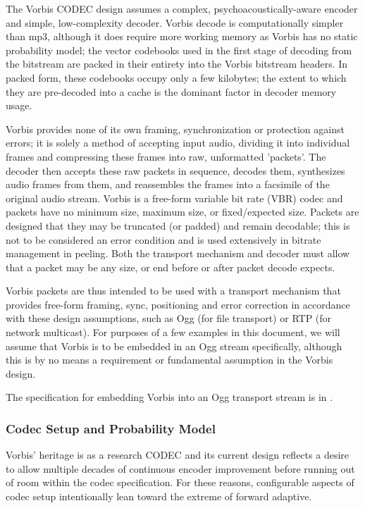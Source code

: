 The Vorbis CODEC design assumes a complex, psychoacoustically-aware
encoder and simple, low-complexity decoder. Vorbis decode is
computationally simpler than mp3, although it does require more
working memory as Vorbis has no static probability model; the vector
codebooks used in the first stage of decoding from the bitstream are
packed in their entirety into the Vorbis bitstream headers. In
packed form, these codebooks occupy only a few kilobytes; the extent
to which they are pre-decoded into a cache is the dominant factor in
decoder memory usage.


Vorbis provides none of its own framing, synchronization or protection
against errors; it is solely a method of accepting input audio,
dividing it into individual frames and compressing these frames into
raw, unformatted 'packets'. The decoder then accepts these raw
packets in sequence, decodes them, synthesizes audio frames from
them, and reassembles the frames into a facsimile of the original
audio stream. Vorbis is a free-form variable bit rate (VBR) codec and packets have no
minimum size, maximum size, or fixed/expected size.  Packets
are designed that they may be truncated (or padded) and remain
decodable; this is not to be considered an error condition and is used
extensively in bitrate management in peeling.  Both the transport
mechanism and decoder must allow that a packet may be any size, or
end before or after packet decode expects.

Vorbis packets are thus intended to be used with a transport mechanism
that provides free-form framing, sync, positioning and error correction
in accordance with these design assumptions, such as Ogg (for file
transport) or RTP (for network multicast).  For purposes of a few
examples in this document, we will assume that Vorbis is to be
embedded in an Ogg stream specifically, although this is by no means a
requirement or fundamental assumption in the Vorbis design.

The specification for embedding Vorbis into
an Ogg transport stream is in .



\subsubsection{Codec Setup and Probability Model}

Vorbis' heritage is as a research CODEC and its current design
reflects a desire to allow multiple decades of continuous encoder
improvement before running out of room within the codec specification.
For these reasons, configurable aspects of codec setup intentionally
lean toward the extreme of forward adaptive.

